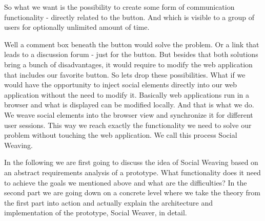 So what we want is the possibility to create some form of communication functionality - directly related to the button. And which is visible to a group of users for optionally unlimited amount of time.

Well a comment box beneath the button would solve the problem. Or a link that leads to a discussion forum - just for the button. But besides that both solutions bring a bunch of disadvantages, it would require to modify the web application that includes our favorite button. So lets drop these possibilities. What if we would have the opportunity to inject social elements directly into our web application without the need to modify it. Basically web applications run in a browser and what is displayed can be modified locally. And that is what we do. We weave social elements into the browser view and synchronize it for different user sessions. This way we reach exactly the functionality we need to solve our problem without touching the web application. We call this process Social Weaving. 

In the following we are first going to discuss the idea of Social Weaving based on  an abstract requirements analysis of a prototype. What functionality does it need to achieve the goals we mentioned above and what are the difficulties? In the second part we are going down on a concrete level where we take the theory from the first part into action and actually explain the architecture and implementation of the prototype, Social Weaver, in detail. 